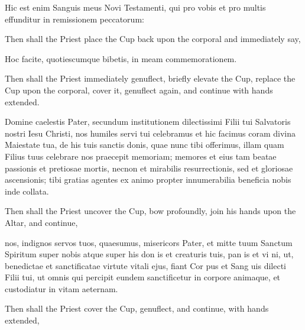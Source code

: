 \begin{center}
\large{Hic est enim Sanguis meus Novi Testamenti, qui pro vobis et pro multis effunditur in remissionem peccatorum:}
\end{center}
\begin{rubric}
    Then shall the Priest place the Cup back upon the corporal and immediately say,
\end{rubric}\par\noindent
    \centerline{Hoc facite, quotiescumque bibetis, in meam commemorationem.}
\begin{rubric}
    Then shall the Priest immediately genuflect, briefly elevate the Cup, replace the Cup upon the corporal, cover it, genuflect again, and continue with hands extended.
\end{rubric}
 Domine caelestis Pater, secundum institutionem dilectissimi Filii tui Salvatoris nostri Iesu Christi, nos humiles servi tui celebramus et hic facimus coram divina Maiestate tua, de his tuis sanctis {} donis, quae nunc tibi offerimus, illam quam Filius tuus celebrare nos praecepit memoriam; memores et eius tam beatae passionis et pretiosae mortis, necnon et mirabilis resurrectionis, sed et gloriosae ascensionis; tibi gratias agentes ex animo propter innumerabilia beneficia nobis inde collata.
\begin{rubric}
	Then shall the Priest uncover the Cup, bow profoundly, join his hands upon the Altar, and continue,
\end{rubric}
 nos, indignos servos tuos, quaesumus, misericors Pater, et mitte tuum Sanctum Spiritum super nobis atque super his don {} is et creaturis tuis, pan {} is et vi {} ni, ut, benedictae et sanctificatae virtute vitali ejus, fiant Cor {} pus et Sang {} uis dilecti Filii tui, ut omnis qui percipit eundem sanctificetur in corpore animaque, et custodiatur in vitam aeternam. 

\begin{rubric}
	Then shall the Priest cover the Cup, genuflect, and continue, with hands extended,
\end{rubric}

